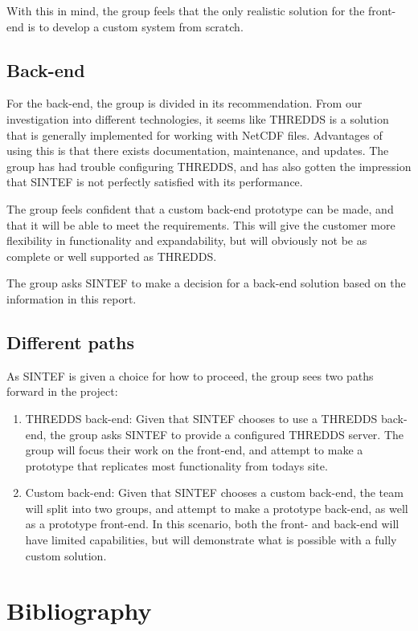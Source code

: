 \documentclass[11pt,a4paper,titlepage,oneside]{report}
\begin{document}
With this in mind, the group feels that the only realistic solution for the front-end is to develop a custom system from scratch.

\section{Back-end}
For the back-end, the group is divided in its recommendation. From our investigation into different technologies, it seems like THREDDS is a solution that is generally implemented for working with NetCDF files. Advantages of using this is that there exists documentation, maintenance, and updates. The group has had trouble configuring THREDDS, and has also gotten the impression that SINTEF is not perfectly satisfied with its performance. 

The group feels confident that a custom back-end prototype can be made, and that it will be able to meet the requirements. This will give the customer more flexibility in functionality and expandability, but will obviously not be as complete or well supported as THREDDS.

The group asks SINTEF to make a decision for a back-end solution based on the information in this report.

\section{Different paths}
As SINTEF is given a choice for how to proceed, the group sees two paths forward in the project:
\begin{enumerate}
\item THREDDS back-end: Given that SINTEF chooses to use a THREDDS back-end, the group asks SINTEF to provide a configured THREDDS server. The group will focus their work on the front-end, and attempt to make a prototype that replicates most functionality from todays site.
\item Custom back-end: Given that SINTEF chooses a custom back-end, the team will split into two groups, and attempt to make a prototype back-end, as well as a prototype front-end. In this scenario, both the front- and back-end will have limited capabilities, but will demonstrate what is possible with a fully custom solution.
\end{enumerate}


\chapter{Bibliography}

\begin{flushleft}
    \nocite{leafletjs.com}
    \nocite{openlayers.org}
	
\end{flushleft}

\appendix
\end{document}
